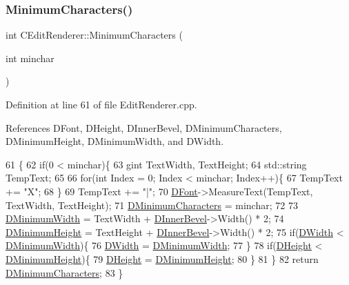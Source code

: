\subsubsection{\texorpdfstring{Minimum\+Characters()}{MinimumCharacters()}\hspace{0.1cm}{\footnotesize\ttfamily [2/2]}}
{\footnotesize\ttfamily int C\+Edit\+Renderer\+::\+Minimum\+Characters (\begin{DoxyParamCaption}\item[{int}]{minchar }\end{DoxyParamCaption})}



Definition at line 61 of file Edit\+Renderer.\+cpp.



References D\+Font, D\+Height, D\+Inner\+Bevel, D\+Minimum\+Characters, D\+Minimum\+Height, D\+Minimum\+Width, and D\+Width.


\begin{DoxyCode}
61                                                \{
62     \textcolor{keywordflow}{if}(0 < minchar)\{
63         gint TextWidth, TextHeight;
64         std::string TempText;
65         
66         \textcolor{keywordflow}{for}(\textcolor{keywordtype}{int} Index = 0; Index < minchar; Index++)\{
67             TempText += \textcolor{stringliteral}{"X"};
68         \}
69         TempText += \textcolor{stringliteral}{"|"};
70         \hyperlink{classCEditRenderer_afd108ae6cb3e9eeffce881a1ada0f0db}{DFont}->MeasureText(TempText, TextWidth, TextHeight);    
71         \hyperlink{classCEditRenderer_ae5d0bd249b2d483c361b0bf9c16c15d3}{DMinimumCharacters} = minchar;
72     
73         \hyperlink{classCEditRenderer_aba068f1e6d267e5ac0ed5752304133e8}{DMinimumWidth} = TextWidth + \hyperlink{classCEditRenderer_a45b1bf4e9aebe3811c15df1018b8d8da}{DInnerBevel}->Width() * 2;
74         \hyperlink{classCEditRenderer_a9e063123747e147ef1c35bd962205fbd}{DMinimumHeight} = TextHeight + \hyperlink{classCEditRenderer_a45b1bf4e9aebe3811c15df1018b8d8da}{DInnerBevel}->Width() * 2;
75         \textcolor{keywordflow}{if}(\hyperlink{classCEditRenderer_ab203e5083f61d3575eb491f170c21d45}{DWidth} < \hyperlink{classCEditRenderer_aba068f1e6d267e5ac0ed5752304133e8}{DMinimumWidth})\{
76             \hyperlink{classCEditRenderer_ab203e5083f61d3575eb491f170c21d45}{DWidth} = \hyperlink{classCEditRenderer_aba068f1e6d267e5ac0ed5752304133e8}{DMinimumWidth};   
77         \}
78         \textcolor{keywordflow}{if}(\hyperlink{classCEditRenderer_ade8dedb4f9790d28b38da8ef20a171cb}{DHeight} < \hyperlink{classCEditRenderer_a9e063123747e147ef1c35bd962205fbd}{DMinimumHeight})\{
79             \hyperlink{classCEditRenderer_ade8dedb4f9790d28b38da8ef20a171cb}{DHeight} = \hyperlink{classCEditRenderer_a9e063123747e147ef1c35bd962205fbd}{DMinimumHeight};   
80         \}
81     \}
82     \textcolor{keywordflow}{return} \hyperlink{classCEditRenderer_ae5d0bd249b2d483c361b0bf9c16c15d3}{DMinimumCharacters};
83 \}
\end{DoxyCode}
\hypertarget{classCEditRenderer_adcb8ea0811710a16181f4caa4c5bb075}{}\label{classCEditRenderer_adcb8ea0811710a16181f4caa4c5bb075} 

